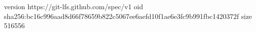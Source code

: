 version https://git-lfs.github.com/spec/v1
oid sha256:bc16c996aad8d66f78659b822c5067ee6aefd10f1ae6e3fc9b991fbc1420372f
size 516556
